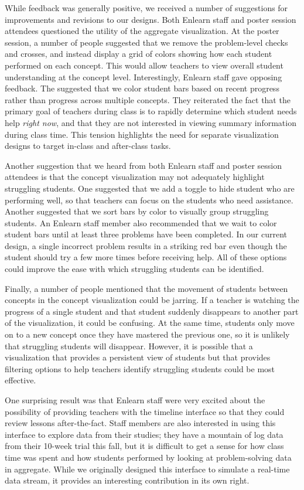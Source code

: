 \documentclass{sigchi}
\begin{document}
While feedback was generally positive, we received a number of suggestions for improvements and revisions to our designs. Both Enlearn staff and poster session attendees questioned the utility of the aggregate visualization. At the poster session, a number of people suggested that we remove the problem-level checks and crosses, and instead display a grid of colors showing how each student performed on each concept. This would allow teachers to view overall student understanding at the concept level. Interestingly, Enlearn staff gave opposing feedback. The suggested that we color student bars based on recent progress rather than progress across multiple concepts. They reiterated the fact that the primary goal of teachers during class is to rapidly determine which student needs help \emph{right now}, and that they are not interested in viewing summary information during class time. This tension highlights the need for separate visualization designs to target in-class and after-class tasks.

Another suggestion that we heard from both Enlearn staff and poster session attendees is that the concept visualization may not adequately highlight struggling students. One suggested that we add a toggle to hide student who are performing well, so that teachers can focus on the students who need assistance. Another suggested that we sort bars by color to visually group struggling students. An Enlearn staff member also recommended that we wait to color student bars until at least three problems have been completed. In our current design, a single incorrect problem results in a striking red bar even though the student should try a few more times before receiving help. All of these options could improve the ease with which struggling students can be identified.

Finally, a number of people mentioned that the movement of students between concepts in the concept visualization could be jarring. If a teacher is watching the progress of a single student and that student suddenly disappears to another part of the visualization, it could be confusing. At the same time, students only move on to a new concept once they have mastered the previous one, so it is unlikely that struggling students will disappear. However, it is possible that a visualization that provides a persistent view of students but that provides filtering options to help teachers identify struggling students could be most effective.

One surprising result was that Enlearn staff were very excited about the possibility of providing teachers with the timeline interface so that they could review lessons after-the-fact. Staff members are also interested in using this interface to explore data from their studies; they have a mountain of log data from their 10-week trial this fall, but it is difficult to get a sense for how class time was spent and how students performed by looking at problem-solving data in aggregate. While we originally designed this interface to simulate a real-time data stream, it provides an interesting contribution in its own right.
\end{document}
